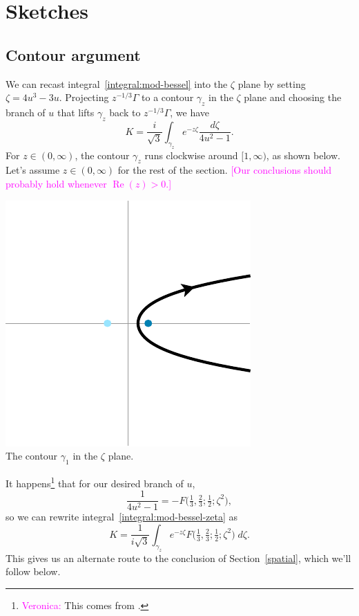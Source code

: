 \documentclass{article}
\theoremstyle{plain}
\begin{document}
\section{Sketches}
\subsection{Contour argument}\label{contour-argument}
We can recast integral~\ref{integral:mod-bessel} into the $\zeta$ plane by setting $\zeta = 4u^3 - 3u$. Projecting $z^{-1/3} \Gamma$ to a contour $\gamma_z$ in the $\zeta$ plane and choosing the branch of $u$ that lifts $\gamma_z$ back to $z^{-1/3} \Gamma$, we have
\begin{equation}\label{integral:mod-bessel-zeta}
K = \frac{i}{\sqrt{3}} \int_{\gamma_z} e^{-z\zeta}\frac{d\zeta}{4u^2 - 1}.
\end{equation}
For $z \in (0, \infty)$, the contour $\gamma_z$ runs clockwise around $[1, \infty)$, as shown below. Let's assume $z \in (0, \infty)$ for the rest of the section. \textcolor{magenta}{[Our conclusions should probably hold whenever $\operatorname{Re}(z) > 0$.]}
\begin{center}
\includegraphics{figures/zeta_contour_3.pdf} \\[1em]
{\small The contour $\gamma_1$ in the $\zeta$ plane.}
\end{center}

It happens\footnote{\textcolor{magenta}{Veronica:} This comes from \cite[equation~15.4.14]{dlmf}.} that for our desired branch of $u$,
\[ \frac{1}{4u^2 - 1} = -F\big(\tfrac{1}{3}, \tfrac{2}{3}; \tfrac{1}{2}; \zeta^2\big), \]
so we can rewrite integral~\ref{integral:mod-bessel-zeta} as
\[ K = \frac{1}{i\sqrt{3}} \int_{\gamma_z} e^{-z\zeta} F\big(\tfrac{1}{3}, \tfrac{2}{3}; \tfrac{1}{2}; \zeta^2\big)\;d\zeta. \]
This gives us an alternate route to the conclusion of Section~\ref{spatial}, which we'll follow below.
\end{document}
